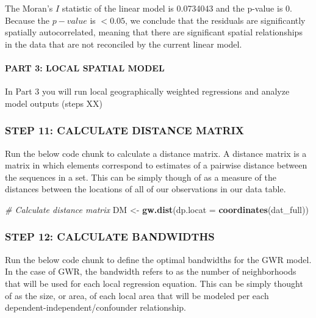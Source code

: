 \documentclass[
  12pt,
]{article}
\newenvironment{Shaded}{\begin{snugshade}}{\end{snugshade}}
\newcommand{\AttributeTok}[1]{\textcolor[rgb]{0.13,0.29,0.53}{#1}}
\newcommand{\CommentTok}[1]{\textcolor[rgb]{0.56,0.35,0.01}{\textit{#1}}}
\newcommand{\FunctionTok}[1]{\textcolor[rgb]{0.13,0.29,0.53}{\textbf{#1}}}
\newcommand{\NormalTok}[1]{#1}
\newcommand{\OtherTok}[1]{\textcolor[rgb]{0.56,0.35,0.01}{#1}}
\begin{document}
The Moran's \(I\) statistic of the linear model is 0.0734043 and the
p-value is 0. Because the \(p-value\) is \(<0.05\), we conclude that the
residuals are significantly spatially autocorrelated, meaning that there
are significant spatial relationships in the data that are not
reconciled by the current linear model.

\hypertarget{part-3-local-spatial-model}{%
\paragraph{PART 3: LOCAL SPATIAL
MODEL}\label{part-3-local-spatial-model}}

In Part 3 you will run local geographically weighted regressions and
analyze model outputs (steps XX)

\hypertarget{step-11-calculate-distance-matrix}{%
\subsubsection{STEP 11: CALCULATE DISTANCE
MATRIX}\label{step-11-calculate-distance-matrix}}

Run the below code chunk to calculate a distance matrix. A distance
matrix is a matrix in which elements correspond to estimates of a
pairwise distance between the sequences in a set. This can be simply
though of as a measure of the distances between the locations of all of
our observations in our data table.

\begin{Shaded}
\begin{Highlighting}[]
\CommentTok{\# Calculate distance matrix}
\NormalTok{DM }\OtherTok{\textless{}{-}} \FunctionTok{gw.dist}\NormalTok{(}\AttributeTok{dp.locat =} \FunctionTok{coordinates}\NormalTok{(dat\_full))}
\end{Highlighting}
\end{Shaded}

\hypertarget{step-12-calculate-bandwidths}{%
\subsubsection{STEP 12: CALCULATE
BANDWIDTHS}\label{step-12-calculate-bandwidths}}

Run the below code chunk to define the optimal bandwidths for the GWR
model. In the case of GWR, the bandwidth refers to as the number of
neighborhoods that will be used for each local regression equation. This
can be simply thought of as the size, or area, of each local area that
will be modeled per each dependent-independent/confounder relationship.
\end{document}
